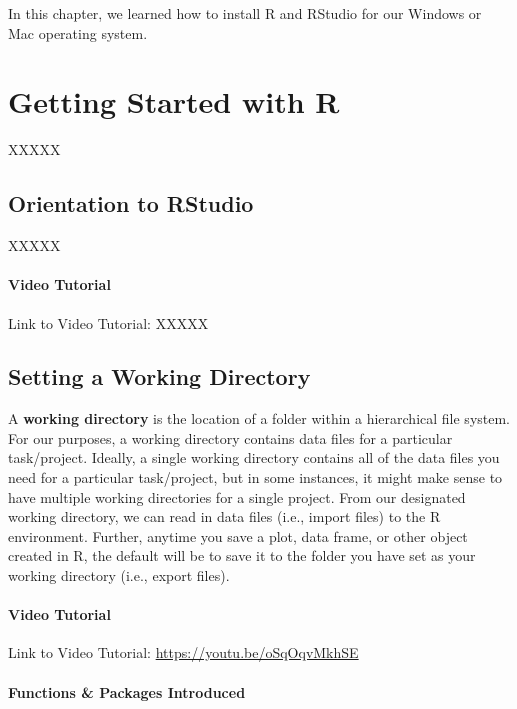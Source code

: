\documentclass[]{book}
\begin{document}
In this chapter, we learned how to install R and RStudio for our Windows
or Mac operating system.

\chapter{Getting Started with R}\label{gettingstarted}

XXXXX

\section{Orientation to RStudio}\label{orientation-to-rstudio}

XXXXX

\subsubsection{Video Tutorial}\label{video-tutorial}

Link to Video Tutorial: XXXXX

\hypertarget{setwd}{\section{Setting a Working Directory}\label{setwd}}

A \textbf{working directory} is the location of a folder within a
hierarchical file system. For our purposes, a working directory contains
data files for a particular task/project. Ideally, a single working
directory contains all of the data files you need for a particular
task/project, but in some instances, it might make sense to have
multiple working directories for a single project. From our designated
working directory, we can read in data files (i.e., import files) to the
R environment. Further, anytime you save a plot, data frame, or other
object created in R, the default will be to save it to the folder you
have set as your working directory (i.e., export files).

\subsubsection{Video Tutorial}\label{video-tutorial-1}

Link to Video Tutorial: \url{https://youtu.be/oSqOqvMkhSE}

\subsubsection{Functions \& Packages
Introduced}\label{functions-packages-introduced}
\end{document}
